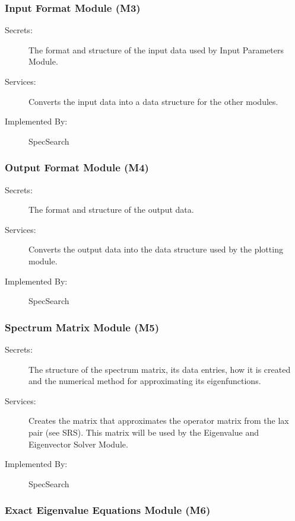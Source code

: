 \documentclass[12pt, titlepage]{article}
\begin{document}
\subsubsection{Input Format Module (M3)}

\begin{description} 
\item[Secrets:]The format and structure of the input data used by Input 
Parameters Module.
\item[Services:]Converts the input data into a data structure for the other 
modules.
\item[Implemented By:]SpecSearch 
\end{description} 

\subsubsection{Output Format Module (M4)}

\begin{description}
	\item[Secrets:]The format and structure of the output data.
	\item[Services:]Converts the output data into the data structure used by the
	plotting module. 
	\item[Implemented By:] SpecSearch
\end{description}

\subsubsection{Spectrum Matrix Module (M5)}

\begin{description}
	\item[Secrets:]The structure of the spectrum matrix, its data entries, how 
	it is created and the numerical method for approximating its 
	eigenfunctions. 
	\item[Services:]Creates the matrix that approximates the operator matrix 
	from the lax pair (see SRS). This matrix will be used by the Eigenvalue and 
	Eigenvector Solver Module. 
	\item[Implemented By:] SpecSearch
\end{description}

\subsubsection{Exact Eigenvalue Equations Module (M6)}
\end{document}
